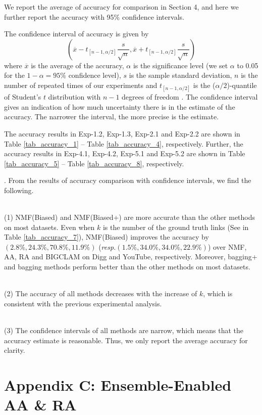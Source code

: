 \documentclass[10pt,journal,compsoc]{IEEEtran}
\newcommand{\stitle}[1]{\vspace{0.5ex}\noindent{\bf #1}}
\newcommand{\NMF}{{\sf NMF}\xspace }
\newcommand{\Biased}{{\sf NMF(Biased)}\xspace}
\newcommand{\Aa}{{\sf AA}\xspace }
\newcommand{\RA}{{\sf RA}\xspace }
\newcommand{\BIGCLAM}{{\sf BIGCLAM}\xspace}
\newcommand{\Digg}{{\sf Digg}\xspace}
\newcommand{\YouTube}{{\sf YouTube}\xspace}
\newcommand{\Biasedp}{{\sf NMF(Biased+)}\xspace}
\newcommand{\resp}{\emph{resp.}\xspace}
\newcommand{\sstab}{\rule{0pt}{8pt}\\[-2.4ex]}
\begin{document}
We report the average of accuracy for comparison in Section 4, and here
we further report the accuracy with 95\% confidence
intervals.

The confidence interval of accuracy is given by
\[ (\overline{x} - t_{[n-1,\alpha/2]}\frac{s}{\sqrt{n}}, \overline{x} + t_{[n-1,\alpha/2]}\frac{s}{\sqrt{n}})  \]
where $\overline{x}$ is the average of the accuracy, $\alpha$ is the significance level
(we set $\alpha$ to 0.05 for the $1 - \alpha = 95\%$ confidence level),
$s$ is the sample standard deviation, $n$ is the number of repeated
times of our experiments and $t_{[n-1,\alpha/2]}$ is the ($\alpha/2$)-quantile
of Student's $t$ distribution with $n - 1$ degrees of freedom \cite{stati}.
The confidence interval gives an indication of how much uncertainty there is in
the estimate of the accuracy. The narrower the interval, the more precise is the estimate.

The accuracy results in Exp-1.2, Exp-1.3, Exp-2.1 and Exp-2.2 are shown in
Table \ref{tab_accuracy_1} -- Table \ref{tab_accuracy_4}, respectively.
Further, the accuracy results in Exp-4.1, Exp-4.2, Exp-5.1 and Exp-5.2 are shown in
Table \ref{tab_accuracy_5} -- Table \ref{tab_accuracy_8}, respectively.


\stitle{Remarks}. From the results of accuracy comparison with confidence intervals,
we find the following.

\sstab (1) \Biased and \Biasedp are more accurate than the other methods
on most datasets. Even when $k$ is the number of the ground truth links (See in Table \ref{tab_accuracy_7}), \Biased improves
the accuracy by $(2.8\%, 24.3\%, 70.8\%, 11.9\%)$ (\resp $(1.5\%, 34.0\%, 34.0\%, 22.9\%)$)
over \NMF, \Aa, \RA and \BIGCLAM on \Digg and \YouTube, respectively.
Moreover, bagging+ and bagging methods perform better than the other methods on most datasets.

\sstab (2) The accuracy of all methods decreases with the increase of $k$,
which is consistent with the previous experimental analysis.

\sstab (3) The confidence intervals of all methods are narrow, which means that the accuracy estimate is reasonable.
Thus, we only report the average accuracy for clarity.






\section{Appendix C: Ensemble-Enabled AA \& RA}
\end{document}
